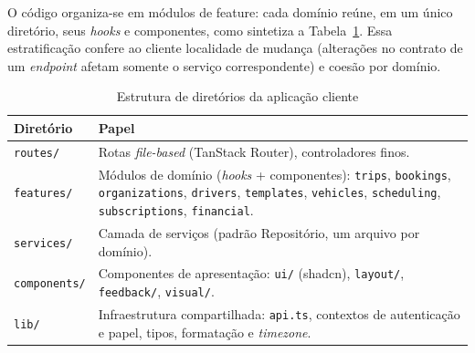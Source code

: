 O código organiza-se em módulos de feature: cada domínio reúne, em um único diretório, seus \textit{hooks} e componentes, como sintetiza a Tabela~\ref{tab:fe_estrutura}. Essa estratificação confere ao cliente localidade de mudança (alterações no contrato de um \textit{endpoint} afetam somente o serviço correspondente) e coesão por domínio.

\begin{table}[H]
\centering
\caption{Estrutura de diretórios da aplicação cliente}
\label{tab:fe_estrutura}
\begin{tabularx}{\textwidth}{l X}
\toprule
\textbf{Diretório} & \textbf{Papel} \\
\midrule
\texttt{routes/}     & Rotas \textit{file-based} (TanStack Router), controladores finos. \\
\texttt{features/}   & Módulos de domínio (\textit{hooks} + componentes): \texttt{trips}, \texttt{bookings}, \texttt{organizations}, \texttt{drivers}, \texttt{templates}, \texttt{vehicles}, \texttt{scheduling}, \texttt{subscriptions}, \texttt{financial}. \\
\texttt{services/}   & Camada de serviços (padrão Repositório, um arquivo por domínio). \\
\texttt{components/} & Componentes de apresentação: \texttt{ui/} (shadcn), \texttt{layout/}, \texttt{feedback/}, \texttt{visual/}. \\
\texttt{lib/}        & Infraestrutura compartilhada: \texttt{api.ts}, contextos de autenticação e papel, tipos, formatação e \textit{timezone}. \\
\bottomrule
\end{tabularx}
\end{table}


